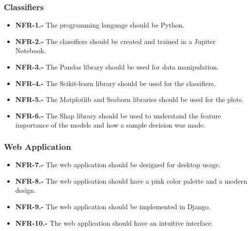 \subsubsection{Classifiers}

\begin{itemize}
    \item \textbf{NFR-1.-} The programming language should be Python.
    \item \textbf{NFR-2.-} The classifiers should be created and trained in a Jupiter Notebook.
    \item \textbf{NFR-3.-} The Pandas library should be used for data manipulation.
    \item \textbf{NFR-4.-} The Scikit-learn library should be used for the classifiers.
    \item \textbf{NFR-5.-} The Matplotlib and Seaborn libraries should be used for the plots.
    \item \textbf{NFR-6.-} The Shap library should be used to understand the feature importance of the models and how a sample decision was made.
\end{itemize}


\subsubsection{Web Application}

\begin{itemize}
    \item \textbf{NFR-7.-} The web application should be designed for desktop usage.
    \item \textbf{NFR-8.-} The web application should have a pink color palette and a modern design.
    \item \textbf{NFR-9.-} The web application should be implemented in Django.
    \item \textbf{NFR-10.-} The web application should have an intuitive interface.
\end{itemize}